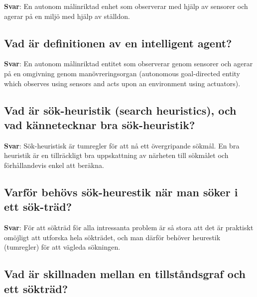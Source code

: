 \documentclass[a4paper,11pt,oneside]{article}
\begin{document}
\begin{sloppypar}
\label{q:326:sa:sv:True}

\textbf{Svar}: En autonom m\r{a}linriktad enhet som observerar med hj\"alp av sensorer och agerar p\r{a} en milj\"o med hj\"alp av st\"alldon.



\subsection{Vad \"ar definitionen av en intelligent agent?}

\label{q:327:sa:sv:True}

\textbf{Svar}: En autonom m\r{a}linriktad entitet som observerar genom sensorer och agerar p\r{a} en omgivning genom man\"ovreringsorgan (autonomous goal-directed entity which observes using sensors and acts upon an environment using actuators).



\subsection{Vad \"ar s\"ok-heuristik (search heuristics), och vad k\"annetecknar bra s\"ok-heuristik?}

\label{q:328:sa:sv:True}

\textbf{Svar}: S\"ok-heuristisk \"ar tumregler f\"or att n\r{a} ett \"overgripande s\"okm\r{a}l. En bra heuristik \"ar en tillr\"ackligt bra uppskattning av n\"arheten till s\"okm\r{a}let och f\"orh\r{a}llandevis enkel att ber\"akna.



\subsection{Varf\"or beh\"ovs s\"ok-heurestik n\"ar man s\"oker i ett s\"ok-tr\"ad?}

\label{q:329:sa:sv:True}

\textbf{Svar}: F\"or att s\"oktr\"ad f\"or alla intressanta problem \"ar s\r{a} stora att det \"ar praktiskt om\"ojligt att utforska hela s\"oktr\"adet, och man d\"arf\"or beh\"over heurestik (tumregler) f\"or att v\"agleda s\"okningen.



\subsection{Vad \"ar skillnaden mellan en tillst\r{a}ndsgraf och ett s\"oktr\"ad?}

\label{q:330:sa:sv:True}


\end{sloppypar}
\end{document}
